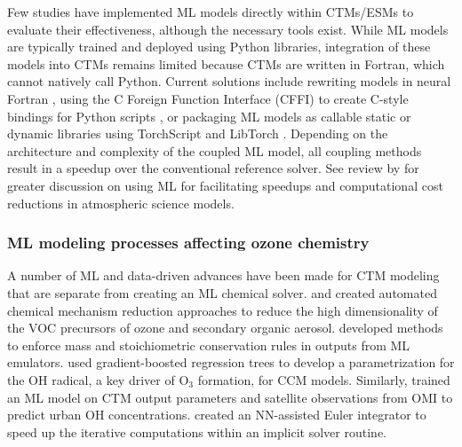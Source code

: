 \documentclass[gmd, manuscript]{copernicus}
\begin{document}
Few studies have implemented ML models directly within CTMs/ESMs to evaluate their effectiveness, although the necessary tools exist. While ML models are typically trained and deployed using Python libraries, integration of these models into CTMs remains limited because CTMs are written in Fortran, which cannot natively call Python. Current solutions include rewriting models in neural Fortran \citep{keller_application_2019}, using the C Foreign Function Interface (CFFI) to create C-style bindings for Python scripts \citep{kelp_online-learned_2022, zhong_wrfml_2023}, or packaging ML models as callable static or dynamic libraries using TorchScript and LibTorch \citep{xia_advancing_2024}. Depending on the architecture and complexity of the coupled ML model, all coupling methods result in a speedup over the conventional reference solver. See review by \citet{de_burgh-day_machine_2023} for greater discussion on using ML for facilitating speedups and computational cost reductions in atmospheric science models. 

\subsubsection{ML modeling processes affecting ozone chemistry}
A number of ML and data-driven advances have been made for CTM modeling that are separate from creating an ML chemical solver. \citet{wiser_amore-isoprene_2023} and \citet{wang_implementation_2023} created automated chemical mechanism reduction approaches to reduce the high dimensionality of the VOC precursors of ozone and secondary organic aerosol. \citet{sturm_conservation_2022, sturm_mass-_2020} developed methods to enforce mass and stoichiometric conservation rules in outputs from ML emulators.\citet{anderson_machine_2022} used gradient-boosted regression trees to develop a parametrization for the OH radical, a key driver of O$_3$ formation, for CCM models. Similarly, \citet{zhu_combining_2022} trained an ML model on CTM output parameters and satellite observations from OMI to predict urban OH concentrations.  \citet{huang_neural_2022} created an NN-assisted Euler integrator to speed up the iterative computations within an implicit solver routine. 
\end{document}
